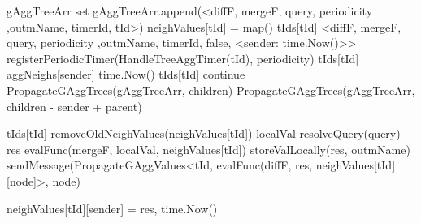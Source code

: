 \begin{algorithm}
\begin{algorithmic}[1]
     \label{alg:mon:global_agg:propag_recv}
        \State gAggTreeArr \asdassign set 
             \label{alg:mon:global_agg:propag_recv_merge}
                \State gAggTreeArr.append(<diffF, mergeF, query, periodicity ,outmName, timerId, tId>)
                \State neighValues[tId] = map()
                \State tIds[tId] \asdassign <diffF, mergeF, query, periodicity ,outmName, timerId, false, <sender: time.Now()>>
                \State registerPeriodicTimer(HandleTreeAggTimer(tId), periodicity)
            \Else \label{alg:mon:global_agg:propag_recv_merge_end}
                \State <diffF, mergeF, query, periodicity ,outmName, timerId, isLocal, aggNeighs> \asdassign tIds[tId]
                \State aggNeighs[sender] \asdassign time.Now()
                \State tIds[tId] \asdassign <diffF, mergeF, query, periodicity ,outmName, timerId, isLocal, aggNeighs>
                    \State continue
                \EndIf
            \EndIf
        \EndFor
            \State PropagateGAggTrees(gAggTreeArr, children)
        \EndIf
            \State PropagateGAggTrees(gAggTreeArr, children - sender + parent)
        \EndIf
    \asdend


     \label{alg:mon:global_agg:export_trigger}
        \State <diffF, mergeF, query, periodicity, outmName, timerId, isLocal, aggNeighs> \asdassign tIds[tId] \label{alg:mon:global_agg:export_trigger_init_part}
        \State removeOldNeighValues(neighValues[tId])
        \State localVal \asdassign resolveQuery(query)
        \State res \asdassign evalFunc(mergeF, localVal, neighValues[tId])
            \State storeValLocally(res, outmName)
        \EndIf  \label{alg:mon:global_agg:export_trigger_init_part_end}
        \label{alg:mon:global_agg:export_trigger_last_part}
            \State sendMessage(PropagateGAggValues<tId, evalFunc(diffF, res, neighValues[tId][node]>, node)
           
        \EndFor \label{alg:mon:global_agg:export_trigger_last_part_end}
    \asdend

     \label{alg:mon:global_agg:recv_propag_vals}
            \State neighValues[tId][sender] = res, time.Now()
        \EndIf
    \asdend


\end{algorithmic}
\end{algorithm}
